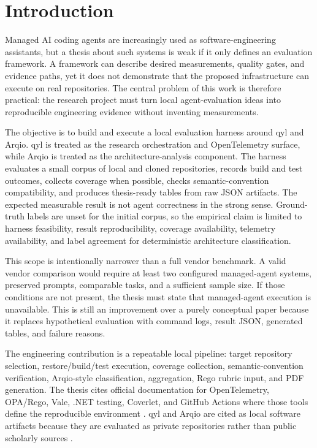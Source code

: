 \chapter{Introduction}

Managed AI coding agents are increasingly used as software-engineering assistants, but a thesis about such systems is weak if it only defines an evaluation framework. A framework can describe desired measurements, quality gates, and evidence paths, yet it does not demonstrate that the proposed infrastructure can execute on real repositories. The central problem of this work is therefore practical: the research project must turn local agent-evaluation ideas into reproducible engineering evidence without inventing measurements.

The objective is to build and execute a local evaluation harness around qyl and Arqio. qyl is treated as the research orchestration and OpenTelemetry surface, while Arqio is treated as the architecture-analysis component. The harness evaluates a small corpus of local and cloned repositories, records build and test outcomes, collects coverage when possible, checks semantic-convention compatibility, and produces thesis-ready tables from raw JSON artifacts. The expected measurable result is not agent correctness in the strong sense. Ground-truth labels are unset for the initial corpus, so the empirical claim is limited to harness feasibility, result reproducibility, coverage availability, telemetry availability, and label agreement for deterministic architecture classification.

This scope is intentionally narrower than a full vendor benchmark. A valid vendor comparison would require at least two configured managed-agent systems, preserved prompts, comparable tasks, and a sufficient sample size. If those conditions are not present, the thesis must state that managed-agent execution is unavailable. This is still an improvement over a purely conceptual paper because it replaces hypothetical evaluation with command logs, result JSON, generated tables, and failure reasons.

The engineering contribution is a repeatable local pipeline: target repository selection, restore/build/test execution, coverage collection, semantic-convention verification, Arqio-style classification, aggregation, Rego rubric input, and PDF generation. The thesis cites official documentation for OpenTelemetry, OPA/Rego, Vale, .NET testing, Coverlet, and GitHub Actions where those tools define the reproducible environment \cite{opentelemetry-dotnet,opentelemetry-semconv,opentelemetry-otlp,opa-rego,vale,dotnet-test,coverlet,github-actions-setup-dotnet}. qyl and Arqio are cited as local software artifacts because they are evaluated as private repositories rather than public scholarly sources \cite{qyl-repo,arqio-repo}.
